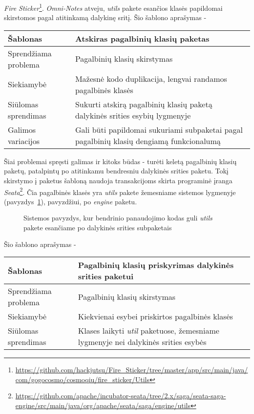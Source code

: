 \textit{Fire Sticker}\footnote{\url{https://github.com/hackjutsu/Fire_Sticker/tree/master/app/src/main/java/com/gogocosmo/cosmoqiu/fire_sticker/Utils}}.
\textit{Omni-Notes} atveju, \textit{utils} pakete esančios klasės papildomai skirstomos pagal atitinkamą dalykinę sritį.
Šio šablono aprašymas -
\begin{center}
    \begin{tabular}{|p{5cm}|p{10cm}|}
        \hline
        Šablonas &  Atskiras pagalbinių klasių paketas \\ [0.5ex]
        \hline\hline
        Sprendžiama problema & Pagalbinių klasių skirstymas\\
        \hline
        Siekiamybė &  Mažesnė kodo duplikacija, lengvai randamos pagalbinės klasės \\
        \hline
        Siūlomas sprendimas & Sukurti atskirą pagalbinių klasių paketą dalykinės srities esybių lygmenyje \\
        \hline
        Galimos variacijos & Gali būti papildomai sukuriami subpaketai pagal pagalbinių klasių dengiamą funkcionalumą \\
        \hline
    \end{tabular}
\end{center}

Šiai problemai spręsti galimas ir kitoks būdas - turėti keletą pagalbinių klasių paketų, patalpintų po atitinkamu bendresniu dalykinės srities
 paketu.
Tokį skirstymo į paketus šabloną naudoja transakcijoms skirta programinė įranga \textit{Seata}\footnote{\url{https://github.com/apache/incubator-seata/tree/2.x/saga/seata-saga-engine/src/main/java/org/apache/seata/saga/engine/utils}}.
Čia pagalbinės klasės yra \textit{utils} pakete žemesniame sistemos lygmenyje (pavyzdys~\ref{img:domainHelpers}), pavyzdžiui, po \textit{engine} paketu.
\begin{figure}[H]
    \snugshade
    \endsnugshade
    \caption{Sistemos pavyzdys, kur bendrinio panaudojimo kodas guli \textit{utils} pakete esančiame po dalykinės srities subpaketais}
    \label{img:domainHelpers}
\end{figure}
Šio šablono aprašymas -
\begin{center}
    \begin{tabular}{|p{5cm}|p{10cm}|}
        \hline
        Šablonas &  Pagalbinių klasių priskyrimas dalykinės srities paketui \\ [0.5ex]
        \hline\hline
        Sprendžiama problema & Pagalbinių klasių skirstymas\\
        \hline
        Siekiamybė &  Kiekvienai esybei priskirtos pagalbinės klasės\\
        \hline
        Siūlomas sprendimas & Klases laikyti \textit{util} paketuose, žemesniame lygmenyje nei dalykinės srities esybės \\
        \hline
    \end{tabular}
\end{center}

